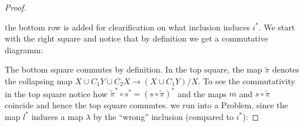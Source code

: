 \begin{proof}
\begin{center}
	\end{center} the bottom row is added for clearification on what inclusion induces $i^*$. We start with the right square and notice that by definition we get a commutative diagramm:
	\begin{center}
	\end{center}
	The bottom square commutes by definition. In the top square, the map $\tilde{\pi}$ denotes the collapsing map $X\cup C_1Y\cup C_2X\to (X\cup C_1Y)\big/X$. To see the commutativity in the top square notice how $\tilde{\pi}^*\circ s^*=(s\circ \tilde{\pi})^*$ and the maps $m$ and $s\circ \tilde{\pi}$ coincide and hence the top square commutes. we run into a Problem, since the map $l^*$ induces a map $\lambda$ by the “wrong” inclusion (compared to $i^*$):

\end{proof}
